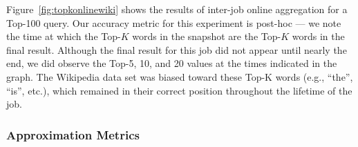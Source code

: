 

Figure~\ref{fig:topkonlinewiki} shows the results of inter-job online
aggregation for a Top-100 query.  Our accuracy metric for this experiment is
post-hoc --- we note the time at which the Top-$K$ words in the snapshot are
the Top-$K$ words in the final result.  Although the final result for this job
did not appear until nearly the end, we did observe the Top-5, 10, and 20
values at the times indicated in the graph.  The Wikipedia data set was biased
toward these Top-K words (e.g., ``the'', ``is'', etc.), which remained in their
correct position throughout the lifetime of the job.

\subsubsection{Approximation Metrics}

